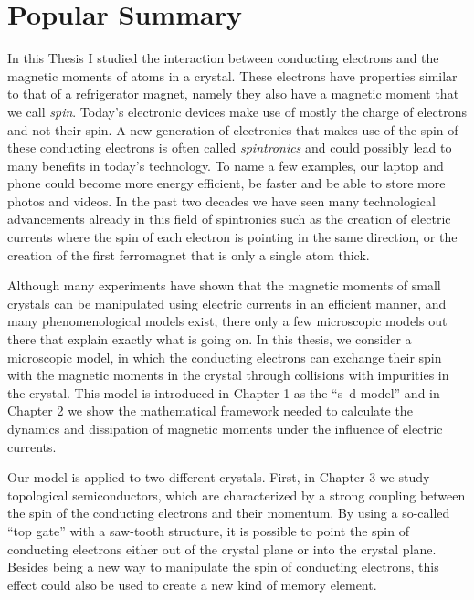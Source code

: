 \manualmark
{}%
%
%
\chapter*{Popular Summary}%
In this Thesis I studied the interaction between conducting electrons and the magnetic moments of atoms in a crystal. These electrons have properties similar to that of a refrigerator magnet, namely they also have a magnetic moment that we call \emph{spin}. Today's electronic devices make use of mostly the charge of electrons and not their spin. A new generation of electronics that makes use of the spin of these conducting electrons is often called \emph{spintronics} and could possibly lead to many benefits in today's technology. To name a few examples, our laptop and phone could become more energy efficient, be faster and be able to store more photos and videos. In the past two decades we have seen many technological advancements already in this field of spintronics such as the creation of electric currents where the spin of each electron is pointing in the same direction, or the creation of the first ferromagnet that is only a single atom thick. 

Although many experiments have shown that the magnetic moments of small crystals can be manipulated using electric currents in an efficient manner, and many phenomenological models exist, there only a few microscopic models out there that explain exactly what is going on. In this thesis, we consider a microscopic model, in which the conducting electrons can exchange their spin with the magnetic moments in the crystal through collisions with impurities in the crystal. This model is introduced in Chapter 1 as the “s--d-model” and in Chapter 2 we show the mathematical framework needed to calculate the dynamics and dissipation of magnetic moments under the influence of electric currents.

Our model is applied to two different crystals. First, in Chapter 3 we study topological semiconductors, which are characterized by a strong coupling between the spin of the conducting electrons and their momentum. By using a so-called “top gate” with a saw-tooth structure, it is possible to point the spin of conducting electrons either out of the crystal plane or into the crystal plane. Besides being a new way to manipulate the spin of conducting electrons, this effect could also be used to create a new kind of memory element.

